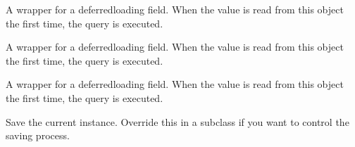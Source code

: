 \documentclass[letterpaper,10pt,french]{sphinxmanual}
\begin{document}
\begin{fulllineitems}
\begin{fulllineitems}
\end{fulllineitems}


\begin{fulllineitems}
\label{\detokenize{main/model:main.models.Salaire.prime_qualite}}
\pysigstartsignatures
{}
\pysigstopsignatures
\sphinxAtStartPar
A wrapper for a deferred\sphinxhyphen{}loading field. When the value is read from this
object the first time, the query is executed.

\end{fulllineitems}


\begin{fulllineitems}
\label{\detokenize{main/model:main.models.Salaire.qualification_professionnel}}
\pysigstartsignatures
{}
\pysigstopsignatures
\sphinxAtStartPar
A wrapper for a deferred\sphinxhyphen{}loading field. When the value is read from this
object the first time, the query is executed.

\end{fulllineitems}


\begin{fulllineitems}
\label{\detokenize{main/model:main.models.Salaire.salaire_net_a_payer}}
\pysigstartsignatures
{}
\pysigstopsignatures
\sphinxAtStartPar
A wrapper for a deferred\sphinxhyphen{}loading field. When the value is read from this
object the first time, the query is executed.

\end{fulllineitems}


\begin{fulllineitems}
\label{\detokenize{main/model:main.models.Salaire.save}}
\pysigstartsignatures
{}
\pysigstopsignatures
\sphinxAtStartPar
Save the current instance. Override this in a subclass if you want to
control the saving process.


\end{fulllineitems}
\end{fulllineitems}
\end{document}
